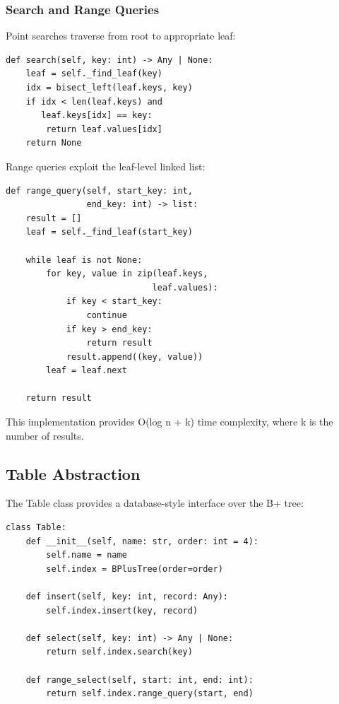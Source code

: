 \documentclass[conference]{IEEEtran}
\begin{document}
\subsubsection{Search and Range Queries}

Point searches traverse from root to appropriate leaf:

\begin{lstlisting}[caption=B+ Tree Search]
def search(self, key: int) -> Any | None:
    leaf = self._find_leaf(key)
    idx = bisect_left(leaf.keys, key)
    if idx < len(leaf.keys) and
       leaf.keys[idx] == key:
        return leaf.values[idx]
    return None
\end{lstlisting}

Range queries exploit the leaf-level linked list:

\begin{lstlisting}[caption=B+ Tree Range Query]
def range_query(self, start_key: int,
                end_key: int) -> list:
    result = []
    leaf = self._find_leaf(start_key)

    while leaf is not None:
        for key, value in zip(leaf.keys,
                             leaf.values):
            if key < start_key:
                continue
            if key > end_key:
                return result
            result.append((key, value))
        leaf = leaf.next

    return result
\end{lstlisting}

This implementation provides O(log n + k) time complexity, where k is the number of results.

\subsection{Table Abstraction}

The Table class provides a database-style interface over the B+ tree:

\begin{lstlisting}[caption=Table Implementation]
class Table:
    def __init__(self, name: str, order: int = 4):
        self.name = name
        self.index = BPlusTree(order=order)

    def insert(self, key: int, record: Any):
        self.index.insert(key, record)

    def select(self, key: int) -> Any | None:
        return self.index.search(key)

    def range_select(self, start: int, end: int):
        return self.index.range_query(start, end)
\end{lstlisting}
\end{document}

